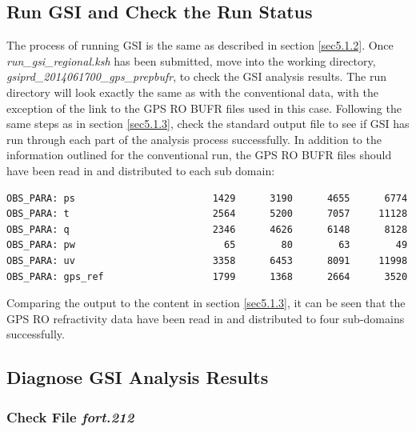 \subsection{Run GSI and Check the Run Status}

The process of running GSI is the same as described in section \ref{sec5.1.2}.  Once \textit{run\_gsi\_regional.ksh} has been submitted, move into the working directory, \textit{gsiprd\_2014061700\_gps\_prepbufr}, to check the GSI analysis results.  The run directory will look exactly the same as with the conventional data, with the exception of the link to the GPS RO BUFR files used in this case. Following the same steps as in section \ref{sec5.1.3}, check the standard output file to see if GSI has run through each part of the analysis process successfully.  In addition to the information outlined for the conventional run, the GPS RO BUFR files should have been read in and distributed to each sub domain:

\begin{scriptsize}
\begin{verbatim}
OBS_PARA: ps                        1429      3190      4655      6774
OBS_PARA: t                         2564      5200      7057     11128
OBS_PARA: q                         2346      4626      6148      8128
OBS_PARA: pw                          65        80        63        49
OBS_PARA: uv                        3358      6453      8091     11998
OBS_PARA: gps_ref                   1799      1368      2664      3520
\end{verbatim}
\end{scriptsize}

Comparing the output to the content in section \ref{sec5.1.3}, it can be seen that the GPS RO refractivity data have been read in and distributed to four sub-domains successfully.

\subsection{Diagnose GSI Analysis Results}

\subsubsection{Check File \textit{fort.212}}

